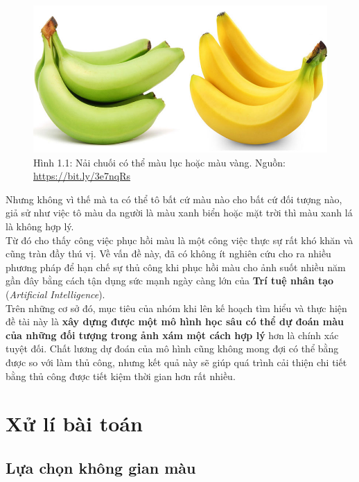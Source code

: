 \documentclass[a4paper]{article}
\begin{document}
\begin{figure}[h!]
\centering
\includegraphics[width=14cm]{images/1_1.jpg}
\caption{Hình 1.1: Nải chuối có thể màu lục hoặc màu vàng. Nguồn: \href{https://bit.ly/3e7nqRs}{https://bit.ly/3e7nqRs}}
\end{figure}

\noindent
Nhưng không vì thế mà ta có thể tô bất cứ màu nào cho bất cứ đối tượng nào, giả sử như việc tô màu da người là màu xanh biển hoặc mặt trời thì màu xanh lá là không hợp lý.\\

\noindent
Từ đó cho thấy công việc phục hồi màu là một công việc thực sự rất khó khăn và cũng tràn đầy thú vị. Về vấn đề này, đã có không ít nghiên cứu cho ra nhiều phương pháp để hạn chế sự thủ công khi phục hồi màu cho ảnh suốt nhiều năm gần đây bằng cách tận dụng sức mạnh ngày càng lớn của \textbf{Trí tuệ nhân tạo} (\textit{Artificial Intelligence}).\\

\noindent
Trên những cơ sở đó, mục tiêu của nhóm khi lên kế hoạch tìm hiểu và thực hiện đề tài này là \textbf{xây dựng được một mô hình học sâu có thể dự đoán màu của những đối tượng trong ảnh xám một cách hợp lý} hơn là chính xác tuyệt đối. Chất lương dự đoán của mô hình cũng không mong đợi có thể bằng được so với làm thủ công, nhưng kết quả này sẽ giúp quá trình cải thiện chi tiết bằng thủ công được tiết kiệm thời gian hơn rất nhiều.

\section{Xử lí bài toán}

\subsection{Lựa chọn không gian màu}
\end{document}
